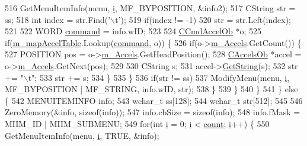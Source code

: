 \begin{DoxyCode}
516           GetMenuItemInfo(menu, \mbox{\hyperlink{expr-lex_8cpp_acb559820d9ca11295b4500f179ef6392}{i}}, MF\_BYPOSITION, &info2);
517           CString str = ss;
518           \textcolor{keywordtype}{int} index = str.Find(\textcolor{charliteral}{'\(\backslash\)t'});
519           \textcolor{keywordflow}{if}(index != -1)
520             str = str.Left(index);
521           
522           WORD \mbox{\hyperlink{_commands_8cpp_a9f83d3c4b4c3bb790f90ad79865e37ab}{command}} = info.wID;
523           
524           \mbox{\hyperlink{class_c_cmd_accel_ob}{CCmdAccelOb}} *o;
525           \textcolor{keywordflow}{if}(\mbox{\hyperlink{class_c_accelerator_manager_a16b8d3e9328bc0eeeb048630deff2768}{m\_mapAccelTable}}.Lookup(\mbox{\hyperlink{_commands_8cpp_a9f83d3c4b4c3bb790f90ad79865e37ab}{command}}, o)) \{
526             \textcolor{keywordflow}{if}(o->\mbox{\hyperlink{class_c_cmd_accel_ob_a85772f1ea9204af42b8a39a0135dc0f8}{m\_Accels}}.GetCount()) \{
527               POSITION pos = o->\mbox{\hyperlink{class_c_cmd_accel_ob_a85772f1ea9204af42b8a39a0135dc0f8}{m\_Accels}}.GetHeadPosition();
528               \mbox{\hyperlink{class_c_accels_ob}{CAccelsOb}} *accel = o->\mbox{\hyperlink{class_c_cmd_accel_ob_a85772f1ea9204af42b8a39a0135dc0f8}{m\_Accels}}.GetNext(pos);
529               
530               CString s;
531               accel->\mbox{\hyperlink{class_c_accels_ob_afaf7510fa1e0707863f6bd469f190de6}{GetString}}(s);
532               str += \textcolor{stringliteral}{"\(\backslash\)t"};
533               str += s;
534             \}
535           \}
536           \textcolor{keywordflow}{if}(str != ss)
537             ModifyMenu(menu, \mbox{\hyperlink{expr-lex_8cpp_acb559820d9ca11295b4500f179ef6392}{i}}, MF\_BYPOSITION | MF\_STRING, info.wID, str);
538         \}
539       \}
540     \}
541   \} \textcolor{keywordflow}{else} \{
542     MENUITEMINFO info;
543     \textcolor{keywordtype}{wchar\_t} ss[128];
544     \textcolor{keywordtype}{wchar\_t} str[512];
545     
546     ZeroMemory(&info, \textcolor{keyword}{sizeof}(info));
547     info.cbSize = \textcolor{keyword}{sizeof}(info);
548     info.fMask = MIIM\_ID | MIIM\_SUBMENU;
549     \textcolor{keywordflow}{for}(\textcolor{keywordtype}{int} \mbox{\hyperlink{expr-lex_8cpp_acb559820d9ca11295b4500f179ef6392}{i}} = 0; \mbox{\hyperlink{expr-lex_8cpp_acb559820d9ca11295b4500f179ef6392}{i}} < \mbox{\hyperlink{expr_8cpp_a16ff2d8e15ade4948398b0aeb80124a8}{count}}; \mbox{\hyperlink{expr-lex_8cpp_acb559820d9ca11295b4500f179ef6392}{i}}++) \{
550       GetMenuItemInfo(menu, \mbox{\hyperlink{expr-lex_8cpp_acb559820d9ca11295b4500f179ef6392}{i}}, TRUE, &info);

\end{DoxyCode}
